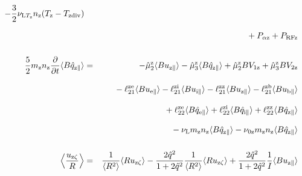 \documentclass[11pt]{article}
\def\r#1{{\rm#1}}
\def\ave#1{\left\langle#1\right\rangle}
\def\aves#1{\langle#1\rangle}
\def\para{\parallel}
\def\ddt{\frac{\partial}{\partial t}}
\def\mz{m_\r{z}}
\def\nz{n_\r{z}}
\def\Tz{T_\r{z}}
\def\uzt#1{u_{\r{#1}\zeta}}
\def\upara#1{u_{\r{#1}\para}}
\def\qhatpara#1{\hat{q}_{\r{#1}\para}}
\def\nun#1{\nu_\r{0#1}}
\def\Tdiv#1{T_\r{#1div}}
\def\nuLT#1{\nu_{\r{L}T_\r{#1}}}
\def\PRF#1{P_\r{RF#1}}
\def\Palp#1{P_{\alpha\r{#1}}}
\def\nuL{\nu_\r{L}}
\begin{document}
\begin{eqnarray}
%
  - \frac{3}{2} \nuLT{z} \nz (\Tz - \Tdiv{z})
\nonumber\\[2.5mm]&&{}
%
  + \Palp{z}
%
  + \PRF{z}
\\[5mm]
 \frac{5}{2} \mz \nz \ddt \aves{B \qhatpara{z}} &=&
%
  - \hat{\mu}_2^\r{z} \aves{B \upara{z}} 
  - \hat{\mu}_3^\r{z} \aves{B \qhatpara{z}}
%
  + \hat{\mu}_2^\r{z} {B V_{1\r{z}}} 
  + \hat{\mu}_3^\r{z} {B V_{2\r{z}}}
\nonumber\\[3mm]&&{}
%
  - \ell_{21}^{\r{ze}} \aves{B \upara{e}}
  - \ell_{21}^{\r{zi}} \aves{B \upara{i}}
  - \ell_{21}^{\r{zz}} \aves{B \upara{z}}
  - \ell_{21}^{\r{zb}} \aves{B \upara{b}}
\nonumber\\[3mm]&&{}
%
  + \ell_{22}^{\r{ze}} \aves{B \qhatpara{e}}
  + \ell_{22}^{\r{zi}} \aves{B \qhatpara{i}}
  + \ell_{22}^{\r{zz}} \aves{B \qhatpara{z}}
\nonumber\\[3mm]&&{}
%
  - \nuL \mz \nz \aves{B \qhatpara{z}}
%
  - \nun{z} \mz \nz \aves{B \qhatpara{z}}
\\[5mm]
    \ave{\frac{\uzt{z}}{R}} &=&
%
    \frac{1}{\aves{R^2}} \aves{R\uzt{z}}
%
  - \frac{2\hat{q}^2}{1+2\hat{q}^2} \frac{1}{\aves{R^2}}\aves{R\uzt{z}}
%
  + \frac{2\hat{q}^2}{1+2\hat{q}^2} \frac{1}{I}\aves{B\upara{z}}
\end{eqnarray}
%
\end{document}
